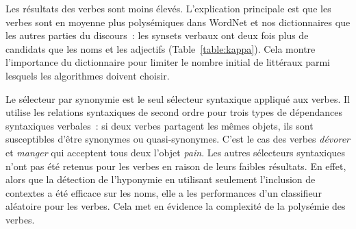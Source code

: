 
Les résultats des verbes 
sont moins élevés. L'explication principale est que les verbes sont en moyenne plus polysémiques dans WordNet et nos dictionnaires que les autres parties du discours~: les synsets verbaux ont deux fois plus de candidats que les noms et les adjectifs (Table~\ref{table:kappa}). Cela montre l'importance du dictionnaire pour limiter le nombre initial de littéraux parmi lesquels les algorithmes doivent choisir.

Le sélecteur par synonymie est le seul sélecteur syntaxique appliqué aux verbes. Il utilise les relations syntaxiques de second ordre pour trois types de dépendances syntaxiques verbales~: si deux verbes partagent les mêmes objets, ils sont susceptibles d'être synonymes ou quasi-synonymes. C'est le cas des verbes \textit{dévorer} et \textit {manger} qui acceptent tous deux l'objet \textit{pain}. Les autres sélecteurs syntaxiques n'ont pas été retenus pour les verbes en raison de leurs faibles résultats. En effet, alors que la détection de l'hyponymie en utilisant seulement l'inclusion de contextes a été efficace sur les noms, elle a les performances d'un classifieur aléatoire pour les verbes. Cela met en évidence la complexité de la polysémie des verbes.

